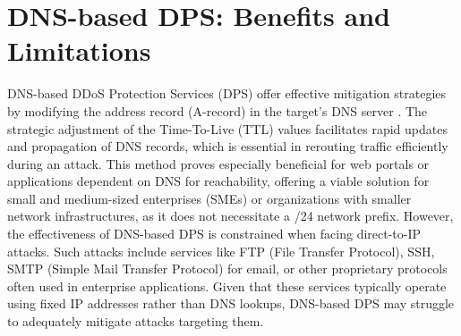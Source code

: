 \section{DNS-based DPS: Benefits and Limitations}\label{sec:DDPS_benefits}
DNS-based DDoS Protection Services (DPS) offer effective mitigation strategies by modifying the address record (A-record) in the target's DNS server \cite{schomp2020akamai}. The strategic adjustment of the Time-To-Live (TTL) values facilitates rapid updates and propagation of DNS records, which is essential in rerouting traffic efficiently during an attack. This method proves especially beneficial for web portals or applications dependent on DNS for reachability, offering a viable solution for small and medium-sized enterprises (SMEs) or organizations with smaller network infrastructures, as it does not necessitate a /24 network prefix. However, the effectiveness of DNS-based DPS is constrained when facing direct-to-IP attacks. Such attacks include services like FTP (File Transfer Protocol), SSH, SMTP (Simple Mail Transfer Protocol) for email, or other proprietary protocols often used in enterprise applications. Given that these services typically operate using fixed IP addresses rather than DNS lookups, DNS-based DPS may struggle to adequately mitigate attacks targeting them.


